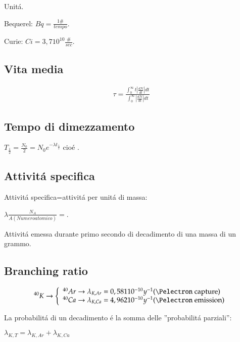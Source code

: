 \documentclass[main.tex]{subfiles}
\begin{document}
Unit\'a.

Bequerel:
$Bq=\frac{1 \#}{tempo}$.

Curie:
$Ci=3,7 10^{10} \frac{\#}{sec}$.

\subsection{Vita media}
\begin{align*}
\tau=\frac{\int_0^{\infty}t|\frac{dN}{dt}|dt}{\int_0^{\infty}|\frac{dN}{dt}|dt}
\end{align*}

\subsection{Tempo di dimezzamento}
$T_{\frac{1}{2}}=\frac{N_0}{2}=N_0e^{-\lambda t_{\frac{1}{2}}}$ cio\'e .

\subsection{Attivit\'a specifica}

Attivit\'a specifica=attivit\'a per unit\'a di massa:

$\lambda\frac{N_A}{A(Numero atomico)}=$.

Attivit\'a emessa durante primo secondo di decadimento di una massa di un grammo.

\subsection{Branching ratio}

\begin{align*}
^{40}K\to\left\{\begin{array}{l} ^{40}Ar \to \lambda_{K,Ar}=0,581 10^{-10} y^{-1} \text{(\Pelectron capture)} \\ ^{40}Ca \to \lambda_{K,Ca}=4,962 10^{-10} y^{-1} \text{(\Pelectron emission)}\\ \end{array} \right.\\
\end{align*}

La probabilit\'a di un decadimento \'e la somma delle ''probabilit\'a parziali'':

$\lambda_{K,T}=\lambda_{K,Ar}+\lambda_{K,Ca}$
\end{document}
